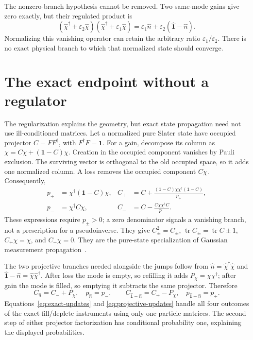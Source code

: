 \documentclass[aps,prb,onecolumn,nofootinbib,superscriptaddress]{revtex4-2}
\newcommand{\One}{\hat{\mathbf{1}}}
\newcommand{\Id}{\mathbf{1}}
\newcommand{\tr}{\operatorname{tr}}
\newcommand{\eps}{\varepsilon}
\begin{document}
The nonzero-branch hypothesis cannot be removed. Two same-mode gains
give zero exactly, but their regulated product is
\begin{equation}
 (\hat\chi^\dagger+\eps_2\hat\chi)
 (\hat\chi^\dagger+\eps_1\hat\chi)
 =\eps_1\hat n+\eps_2(\One-\hat n).
 \label{eq:zero-branch}
\end{equation}
Normalizing this vanishing operator can retain the arbitrary ratio
$\eps_1/\eps_2$. There is no exact physical branch to which that normalized
state should converge.

\section{The exact endpoint without a regulator}
The regularization explains the geometry, but exact state propagation
need not use ill-conditioned matrices. Let a normalized pure Slater
state have occupied projector $C=FF^\dagger$, with $F^\dagger F=\Id$.
For a gain, decompose its column as
$\chi=C\chi+(\Id-C)\chi$. Creation in the occupied component vanishes by
Pauli exclusion. The surviving vector is orthogonal to the old occupied
space, so it adds one normalized column. A loss removes the occupied
component $C\chi$. Consequently,
\begin{align}
 p_+&=\chi^\dagger(\Id-C)\chi,&
 C_+&=C+\frac{(\Id-C)\chi\chi^\dagger(\Id-C)}{p_+},\nonumber\\
 p_-&=\chi^\dagger C\chi,&
 C_-&=C-\frac{C\chi\chi^\dagger C}{p_-}.
 \label{eq:exact-updates}
\end{align}
These expressions require $p_\pm>0$; a zero denominator signals a
vanishing branch, not a prescription for a pseudoinverse. They give
$C_\pm^2=C_\pm$, $\tr C_\pm=\tr C\pm1$,
$C_+\chi=\chi$, and $C_-\chi=0$. They are the pure-state specialization
of Gaussian measurement propagation~\cite{Bravyi2005}.

The two projective branches needed alongside the jumps follow from
$\hat n=\hat\chi^\dagger\hat\chi$ and
$\One-\hat n=\hat\chi\hat\chi^\dagger$. After loss the mode is empty,
so refilling it adds $P_\chi=\chi\chi^\dagger$; after gain the mode is
filled, so emptying it subtracts the same projector. Therefore
\begin{equation}
 C_{\hat n}=C_-+P_\chi,\quad p_{\hat n}=p_-,\qquad
 C_{\One-\hat n}=C_+-P_\chi,\quad p_{\One-\hat n}=p_+.
 \label{eq:projective-updates}
\end{equation}
Equations~\eqref{eq:exact-updates} and \eqref{eq:projective-updates}
handle all four outcomes of the exact fill/deplete instruments using only
one-particle matrices. The second step of either projector factorization
has conditional probability one, explaining the displayed probabilities.
\end{document}
